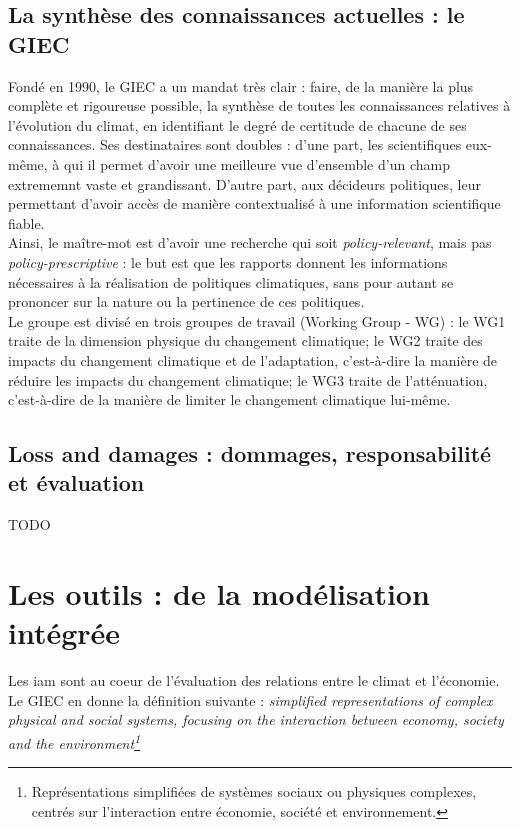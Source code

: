 \subsection{La synthèse des connaissances actuelles : le GIEC}
\label{sect:1.2.3}

Fondé en 1990, le GIEC a un mandat très clair : faire, de la manière la plus complète et rigoureuse possible, la synthèse de toutes les connaissances relatives à l'évolution du climat, en identifiant le degré de certitude de chacune de ses connaissances. Ses destinataires sont doubles : d'une part, les scientifiques eux-même, à qui il permet d'avoir une meilleure vue d'ensemble d'un champ extrememnt vaste et grandissant. D'autre part, aux décideurs politiques, leur permettant d'avoir accès de manière contextualisé à une information scientifique fiable. \\

Ainsi, le maître-mot est d'avoir une recherche qui soit \emph{policy-relevant}, mais pas \emph{policy-prescriptive} : le but est que les rapports donnent les informations nécessaires à la réalisation de politiques climatiques, sans pour autant se prononcer sur la nature ou la pertinence de ces politiques. \\

Le groupe est divisé en trois groupes de travail (Working Group - WG)  : le WG1 traite de la dimension physique du changement climatique; le WG2 traite des impacts du changement climatique et de l'adaptation, c'est-à-dire la manière de réduire les impacts du changement climatique; le WG3 traite de l'atténuation, c'est-à-dire de la manière de limiter le changement climatique lui-même. 


\subsection{Loss and damages : dommages, responsabilité et évaluation}
\label{sect:1.2.4}

TODO

\section{Les outils : de la modélisation intégrée}
\label{sect:1.3}

Les \Gls{iam} sont au coeur de l'évaluation des relations entre le climat et l'économie. Le GIEC en donne la définition suivante : \emph{{simplified representations of complex physical and social systems, focusing on the interaction between economy, society and the environment}\footnote{Représentations simplifiées de systèmes sociaux ou physiques complexes, centrés sur l'interaction entre économie, société et environnement.}}\\

